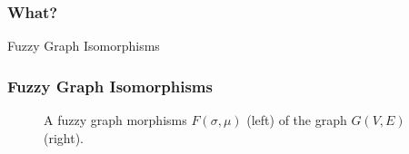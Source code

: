 



\begin{frame}
	\frametitle{What?}

	\begin{block}{Fuzzy Graph Isomorphisms}
	\end{block}
\end{frame}

\begin{frame}
	\frametitle{Fuzzy Graph Isomorphisms}

	\begin{figure}[htbp]
		\centering
		\begin{subfigure}[t]{0.52\textwidth}
			\centering
		\end{subfigure}
		\quad
		\begin{subfigure}[t]{0.27\textwidth}
			\centering
		\end{subfigure}
		\caption{A fuzzy graph morphisms  $F(\sigma, \mu)$ (left) of the graph $G(V, E)$ (right).}
	\end{figure}

\end{frame}
